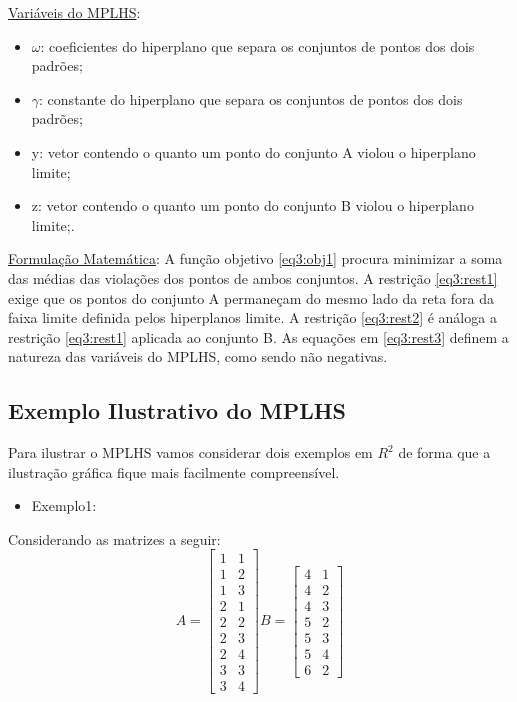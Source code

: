 \underline{Variáveis do MPLHS}:
\begin{itemize}
\item{$\omega$}: coeficientes do hiperplano que separa os conjuntos de pontos dos dois padrões;
\item{$\gamma$}: constante do hiperplano que separa os conjuntos de pontos dos dois padrões;
\item{y}: vetor contendo o quanto um ponto do conjunto A violou o hiperplano limite;
\item{z}: vetor contendo o quanto um ponto do conjunto B violou o hiperplano limite;.
\end{itemize}

\underline{Formulação Matemática}:
A função objetivo \ref{eq3:obj1} procura minimizar a soma das médias das violações dos pontos de ambos conjuntos. A restrição \ref{eq3:rest1} exige que os pontos do conjunto A permaneçam do mesmo lado da reta fora da faixa limite definida pelos hiperplanos limite.  A restrição \ref{eq3:rest2} é análoga a restrição \ref{eq3:rest1} aplicada ao conjunto B. As equações em \ref{eq3:rest3} definem a natureza das variáveis do MPLHS, como sendo não negativas.

\subsection{Exemplo Ilustrativo do MPLHS}
Para ilustrar o MPLHS vamos considerar dois exemplos em $R^{2}$ \cite{Bennett92robustlinear} de forma que a ilustração gráfica fique mais facilmente compreensível.
\begin{itemize}
\item Exemplo1:
\end{itemize}

Considerando as matrizes a seguir:
$$A=\begin{bmatrix}1 & 1\\ 1 & 2\\ 1 & 3\\ 2 & 1\\ 2 & 2\\ 2 & 3\\ 2 & 4\\ 3 & 3\\ 3 & 4\end{bmatrix}
B=\begin{bmatrix}4 & 1\\ 4 & 2\\ 4 & 3\\ 5 & 2\\ 5 & 3\\ 5 & 4\\ 6 & 2\end{bmatrix}$$

